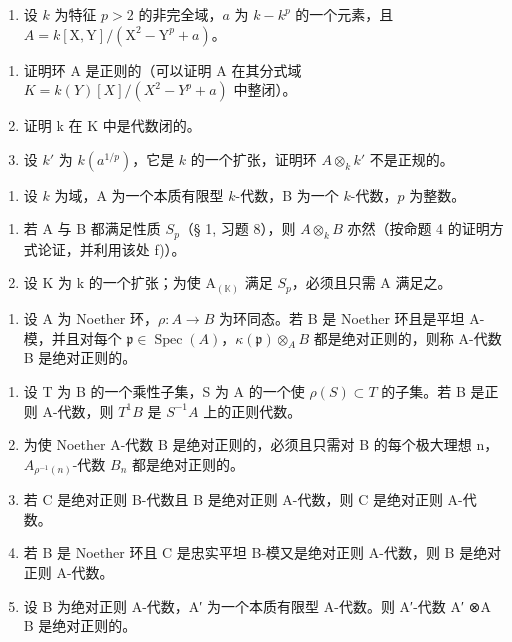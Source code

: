 
\begin{enumerate}
\def\labelenumi{\arabic{enumi})}
\tightlist
\item
  设 \(k\) 为特征 \(p > 2\) 的非完全域，\(a\) 为 \(k - k^p\) 的一个元素，且 \(A = k[\mathrm{X},\mathrm{Y}] / (\mathrm{X}^2 -\mathrm{Y}^p +a)\)。
\end{enumerate}

\begin{enumerate}
\def\labelenumi{\alph{enumi})}
\item
  证明环 A 是正则的（可以证明 A 在其分式域 \(K = k(Y)[X]/(X^{2} - Y^{p} + a)\) 中整闭）。
\item
  证明 k 在 K 中是代数闭的。
\item
  设 \(k'\) 为 \(k(a^{1/p})\)，它是 \(k\) 的一个扩张，证明环 \(A \otimes_k k'\) 不是正规的。
\end{enumerate}

\begin{enumerate}
\def\labelenumi{\arabic{enumi})}
\setcounter{enumi}{1}
\tightlist
\item
  设 \(k\) 为域，A 为一个本质有限型 \(k\)-代数，B 为一个 \(k\)-代数，\(p\) 为整数。
\end{enumerate}

\begin{enumerate}
\def\labelenumi{\alph{enumi})}
\item
  若 A 与 B 都满足性质 \(S_{p}\)（§ 1, 习题 8），则 \(A \otimes_{k} B\) 亦然（按命题 4 的证明方式论证，并利用该处 f)）。
\item
  设 K 为 k 的一个扩张；为使 \(\mathrm{A}_{(\mathbb{K})}\) 满足 \(S_{p}\)，必须且只需 A 满足之。
\end{enumerate}

\begin{enumerate}
\def\labelenumi{\arabic{enumi})}
\setcounter{enumi}{2}
\tightlist
\item
  设 A 为 Noether 环，\(\rho : A \to B\) 为环同态。若 B 是 Noether 环且是平坦 A-模，并且对每个 \(\mathfrak{p} \in \operatorname{Spec}(A)\)，\(\kappa(\mathfrak{p}) \otimes_{A} B\) 都是绝对正则的，则称 A-代数 B 是绝对正则的。
\end{enumerate}

\begin{enumerate}
\def\labelenumi{\alph{enumi})}
\item
  设 T 为 B 的一个乘性子集，S 为 A 的一个使 \(\rho(S) \subset T\) 的子集。若 B 是正则 A-代数，则 \(T^{1}B\) 是 \(S^{-1}A\) 上的正则代数。
\item
  为使 Noether A-代数 B 是绝对正则的，必须且只需对 B 的每个极大理想 n，\(A_{\rho^{-1}(n)}\)-代数 \(B_{n}\) 都是绝对正则的。
\item
  若 C 是绝对正则 B-代数且 B 是绝对正则 A-代数，则 C 是绝对正则 A-代数。
\item
  若 B 是 Noether 环且 C 是忠实平坦 B-模又是绝对正则 A-代数，则 B 是绝对正则 A-代数。
\item
  设 B 为绝对正则 A-代数，A′ 为一个本质有限型 A-代数。则 A′-代数 A′ ⊗A B 是绝对正则的。
\end{enumerate}

